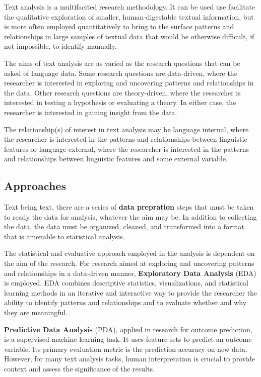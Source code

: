 \documentclass[
  letterpaper,
]{latex/krantz}
\theoremstyle{definition}
\theoremstyle{remark}
\begin{document}
Text analysis is a multifacited research methodology. It can be used use
facilitate the qualitative exploration of smaller, human-digestable
textual information, but is more often employed quantitatively to bring
to the surface patterns and relationships in large samples of textual
data that would be otherwise difficult, if not impossible, to identify
manually.

The aims of text analysis are as varied as the research questions that
can be asked of language data. Some research questions are data-driven,
where the researcher is interested in exploring and uncovering patterns
and relationships in the data. Other research questions are
theory-driven, where the researcher is interested in testing a
hypothesis or evaluating a theory. In either case, the researcher is
interested in gaining insight from the data.

The relationship(s) of interest in text analysis may be language
internal, where the researcher is interested in the patterns and
relationships between linguistic features or language external, where
the researcher is interested in the patterns and relationships between
linguistic features and some external variable.

\subsection{Approaches}\label{approaches}

Text being text, there are a series of \textbf{data prepration} steps
that must be taken to ready the data for analysis, whatever the aim may
be. In addition to collecting the data, the data must be organized,
cleaned, and transformed into a format that is amenable to statistical
analysis.

The statistical and evaluative approach employed in the analysis is
dependent on the aim of the research. For research aimed at exploring
and uncovering patterns and relationships in a data-driven manner,
\textbf{Exploratory Data Analysis} (EDA) is employed. EDA combines
descriptive statistics, visualizations, and statistical learning methods
in an iterative and interactive way to provide the researcher the
ability to identify patterns and relationships and to evaluate whether
and why they are meaningful.

\textbf{Predictive Data Analysis} (PDA), applied in research for outcome
prediction, is a supervised machine learning task. It uses feature sets
to predict an outcome variable. Its primary evaluation metric is the
prediction accuracy on new data. However, for many text analysis tasks,
human interpretation is crucial to provide context and assess the
significance of the results.
\end{document}
